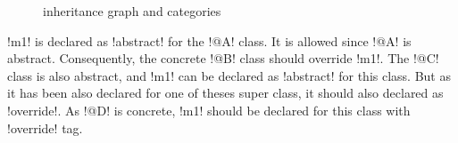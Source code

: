 \begin{figure}[t]
  \centering
  \caption{inheritance graph and categories}
\end{figure}

\ggsq!m1! is declared as \ggsq!abstract! for the \ggsq!@A! class. It is allowed since \ggsq!@A! is abstract. Consequently, the concrete \ggsq!@B! class should override \ggsq!m1!. The \ggsq!@C! class is also abstract, and \ggsq!m1! can be declared as \ggsq!abstract! for this class. But as it has been also declared for one of theses super class, it should also declared as \ggsq!override!. As \ggsq!@D! is concrete, \ggsq!m1! should be declared for this class with \ggsq!override! tag.










